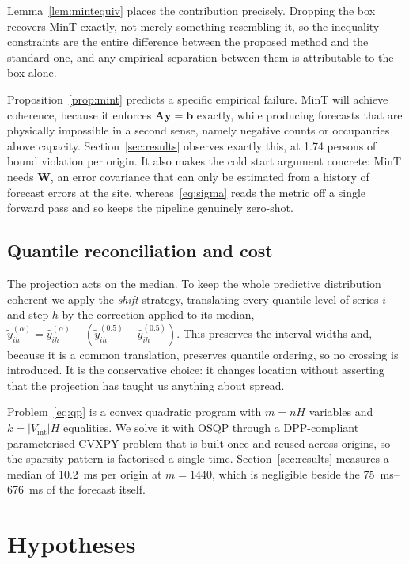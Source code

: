 \documentclass[11pt]{article}
\theoremstyle{plain}
\theoremstyle{definition}
\theoremstyle{remark}
\newcommand{\bA}{\bm{A}}
\newcommand{\by}{\bm{y}}
\newcommand{\bb}{\bm{b}}
\begin{document}
Lemma~\ref{lem:mintequiv} places the contribution precisely. Dropping the box recovers MinT exactly, not merely something resembling it, so the inequality constraints are the entire difference between the proposed method and the standard one, and any empirical separation between them is attributable to the box alone.

Proposition~\ref{prop:mint} predicts a specific empirical failure. MinT will achieve coherence, because it enforces $\bA\by=\bb$ exactly, while producing forecasts that are physically impossible in a second sense, namely negative counts or occupancies above capacity. Section~\ref{sec:results} observes exactly this, at \num{1.74} persons of bound violation per origin. It also makes the cold start argument concrete: MinT needs $\bm{W}$, an error covariance that can only be estimated from a history of forecast errors at the site, whereas~\eqref{eq:sigma} reads the metric off a single forward pass and so keeps the pipeline genuinely zero-shot.

\subsection{Quantile reconciliation and cost}

The projection acts on the median. To keep the whole predictive distribution coherent we apply the \emph{shift} strategy, translating every quantile level of series $i$ and step $h$ by the correction applied to its median, $\tilde{y}^{(\alpha)}_{ih} = \hat{y}^{(\alpha)}_{ih} + (\tilde{y}^{(0.5)}_{ih} - \hat{y}^{(0.5)}_{ih})$. This preserves the interval widths and, because it is a common translation, preserves quantile ordering, so no crossing is introduced. It is the conservative choice: it changes location without asserting that the projection has taught us anything about spread.

Problem~\eqref{eq:qp} is a convex quadratic program with $m = nH$ variables and $k = |V_{\mathrm{int}}|H$ equalities. We solve it with OSQP \citep{osqp} through a DPP-compliant parameterised CVXPY \citep{cvxpy} problem that is built once and reused across origins, so the sparsity pattern is factorised a single time. Section~\ref{sec:results} measures a median of \SI{10.2}{\milli\second} per origin at $m=\num{1440}$, which is negligible beside the \SIrange{75}{676}{\milli\second} of the forecast itself.

\section{Hypotheses}
\label{sec:hypotheses}
\end{document}
